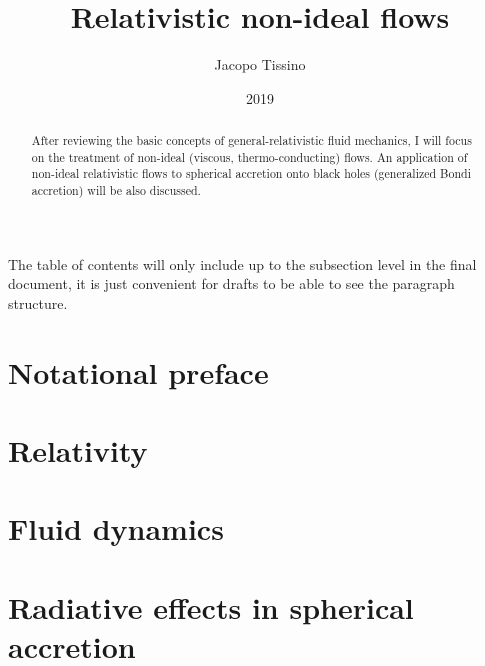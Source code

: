 \documentclass[a4paper, 11pt]{article}
\title{Relativistic non-ideal flows}
\author{Jacopo Tissino}
\date{2019}
\begin{document}


\begin{abstract}
After reviewing the basic concepts of general-relativistic fluid mechanics, I will focus on the treatment of non-ideal
(viscous, thermo-conducting) flows. An application of non-ideal relativistic flows to spherical accretion onto black holes
(generalized Bondi accretion) will be also discussed.
\end{abstract}

\setcounter{tocdepth}{4}
The table of contents will only include up to the subsection level in the final document, it is just convenient for drafts to be able to see the paragraph structure.
\tableofcontents

\section{Notational preface} \label{sec:notational-preface}


\section{Relativity} \label{sec:general-relativity}


\section{Fluid dynamics} \label{sec:fluid-dynamics}


\section{Radiative effects in spherical accretion} \label{sec:radiative-effects}


% 

\printbibliography[title={Bibliography}]

\end{document}
